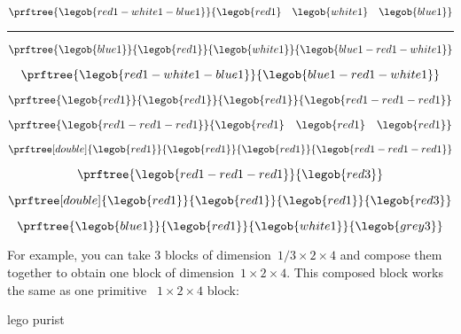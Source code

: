 \begin{equation}
\prftree{\legob{red1-white1-blue1}}{\legob{red1}\quad\legob{white1}\quad \legob{blue1} }
\end{equation}
\hrule
\begin{equation}
\prftree{\legob{blue1}}{\legob{red1}}{\legob{white1}}{\legob{blue1-red1-white1}}
\end{equation}

\begin{equation}
\prftree{\legob{red1-white1-blue1}}{\legob{blue1-red1-white1}}
\end{equation}

\begin{equation}
\prftree{\legob{red1}}{\legob{red1}}{\legob{red1}}{\legob{red1-red1-red1}}
\end{equation}

\begin{equation}
\prftree{\legob{red1-red1-red1}}{\legob{red1}\quad\legob{red1}\quad\legob{red1}}
\end{equation}

\begin{equation}
\prftree[double]{\legob{red1}}{\legob{red1}}{\legob{red1}}{\legob{red1-red1-red1}}
\end{equation}

\begin{equation}
\prftree{\legob{red1-red1-red1}}{\legob{red3}}
\end{equation}



\begin{equation}
\prftree[double]{\legob{red1}}{\legob{red1}}{\legob{red1}}{\legob{red3}}
\end{equation}


\begin{equation}
\prftree{\legob{blue1}}{\legob{red1}}{\legob{white1}}{\legob{grey3}}
\end{equation}


For example, you can take 3 blocks of dimension~$1/3 \times 2 \times 4$ and compose them together to obtain one block of dimension~$1 \times 2 \times 4$. This composed block works the same as one primitive ~$1 \times 2 \times 4 $ block:



lego purist

\begin{center}
\end{center}


